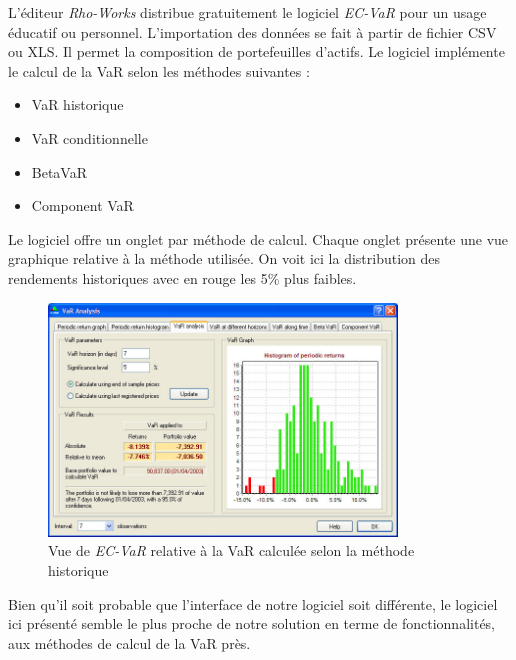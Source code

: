 		L'éditeur \textit{Rho-Works} distribue gratuitement le logiciel \textit{EC-VaR} pour un usage éducatif ou personnel. L'importation des données se fait à partir de fichier CSV ou XLS. Il permet la composition de portefeuilles d'actifs. Le logiciel implémente le calcul de la VaR selon les méthodes suivantes :
		\begin{itemize}
			\item VaR historique
			\item VaR conditionnelle
			\item BetaVaR
			\item Component VaR %
		\end{itemize}
		\nocite{website:Rho-Works}

		Le logiciel offre un onglet par méthode de calcul. Chaque onglet présente une vue graphique relative à la méthode utilisée. On voit ici la distribution des rendements historiques avec en rouge les 5\% plus faibles.

		\begin{figure}[h]
			\center
			\includegraphics[width=350px]{ecvar_1b.jpg}
			\caption{Vue de \textit{EC-VaR} relative à la VaR calculée selon la méthode historique}
		\end{figure}

		Bien qu'il soit probable que l'interface de notre logiciel soit différente, le logiciel ici présenté semble le plus proche de notre solution en terme de fonctionnalités, aux méthodes de calcul de la VaR près. %

